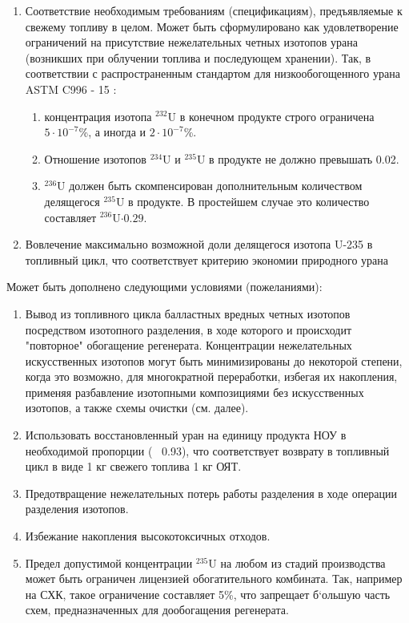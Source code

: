 \begin{enumerate}
  \item Соответствие необходимым требованиям (спецификациям), предъявляемые к свежему топливу в целом. Может быть сформулировано как удовлетворение ограничений на присутствие нежелательных четных изотопов урана (возникших при облучении топлива и последующем хранении). Так, в соответствии с распространенным стандартом для низкообогощенного урана ASTM C996 - 15 \cite{c26committeeSpecificationUraniumHexafluoride}:
  \begin{enumerate}
    \item концентрация изотопа $^{232}$U в конечном продукте строго ограничена $5\cdot10^{-7}$\%, а иногда и $2\cdot10^{-7}$\%.
    \item Отношение изотопов $^{234}$U и $^{235}$U в продукте не должно превышать 0.02.
    \item $^{236}$U должен быть скомпенсирован дополнительным количеством делящегося $^{235}$U в продукте. В простейшем случае это количество составляет $^{236}$U$\cdot0.29$.
  \end{enumerate}
  \item Вовлечение максимально возможной доли делящегося изотопа U-235 в топливный цикл, что соответствует критерию экономии природного урана
\end{enumerate}

Может быть дополнено следующими условиями (пожеланиями):
\begin{enumerate}
  \item Вывод из топливного цикла балластных вредных четных изотопов посредством изотопного разделения, в ходе которого и происходит "повторное" обогащение регенерата. Концентрации нежелательных искусственных изотопов могут быть минимизированы до некоторой степени, когда это возможно, для многократной переработки, избегая их накопления, применяя разбавление изотопными композициями без искусственных изотопов, а также схемы очистки (см. далее).
  \item Использовать восстановленный уран на единицу продукта НОУ в необходимой пропорции (~ 0.93), что соответствует возврату в топливный цикл в виде 1 кг свежего топлива 1 кг ОЯТ.
  \item Предотвращение нежелательных потерь работы разделения в ходе операции разделения изотопов.
  \item Избежание накопления высокотоксичных отходов.
  \item Предел допустимой концентрации $^{235}$U на любом из стадий производства может быть ограничен лицензией обогатительного комбината. Так, например на СХК, такое ограничение составляет 5\%, что запрещает б`ольшую часть схем, предназначенных для дообогащения регенерата.
\end{enumerate}

